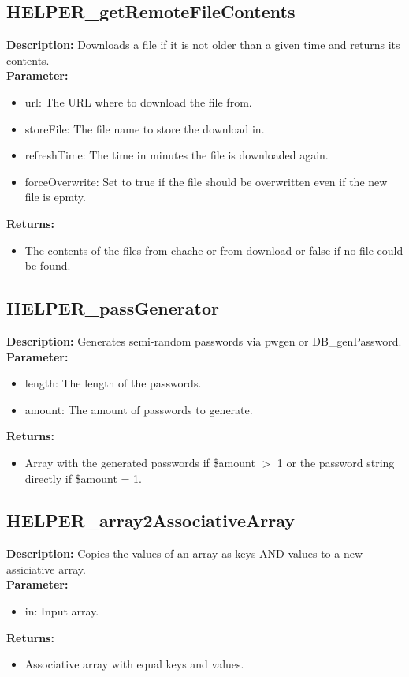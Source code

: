 \subsection{HELPER\_getRemoteFileContents}
\textbf{Description:} Downloads a file if it is not older than a given time and returns its contents.\\
\textbf{Parameter:}
\begin{itemize}
\item url: The URL where to download the file from.
\item storeFile: The file name to store the download in.
\item refreshTime: The time in minutes the file is downloaded again.
\item forceOverwrite: Set to true if the file should be overwritten even if the new file is epmty.
\end{itemize}
\textbf{Returns:}
\begin{itemize}
\item The contents of the files from chache or from download or false if no file could be found.
\end{itemize}

\subsection{HELPER\_passGenerator}
\textbf{Description:} Generates semi-random passwords via pwgen or DB\_genPassword.\\
\textbf{Parameter:}
\begin{itemize}
\item length: The length of the passwords.
\item amount: The amount of passwords to generate.
\end{itemize}
\textbf{Returns:}
\begin{itemize}
\item Array with the generated passwords if \$amount $>$ 1 or the password string directly if \$amount = 1.
\end{itemize}

\subsection{HELPER\_array2AssociativeArray}
\textbf{Description:} Copies the values of an array as keys AND values to a new assiciative array.\\
\textbf{Parameter:}
\begin{itemize}
\item in: Input array.
\end{itemize}
\textbf{Returns:}
\begin{itemize}
\item Associative array with equal keys and values.
\end{itemize}

